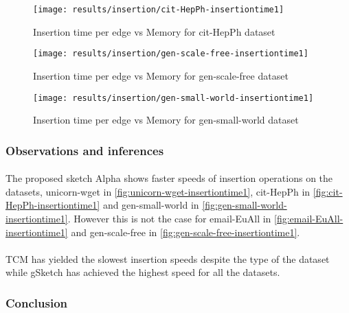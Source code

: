 \begin{figure}[H]
    \centering \texttt{[image: results/insertion/cit-HepPh-insertiontime1]}
    \vspace{-0.5cm}
    \caption{Insertion time per edge vs Memory for cit-HepPh dataset}
    \label{fig:cit-HepPh-insertiontime1}
\end{figure}

\begin{figure}[H]
    \centering \texttt{[image: results/insertion/gen-scale-free-insertiontime1]}
    \vspace{-0.5cm}
    \caption{Insertion time per edge vs Memory for gen-scale-free dataset}
    \label{fig:gen-scale-free-insertiontime1}
\end{figure}

\begin{figure}[H]
    \centering \texttt{[image: results/insertion/gen-small-world-insertiontime1]}
    \vspace{-0.5cm}
    \caption{Insertion time per edge vs Memory for gen-small-world dataset}
    \label{fig:gen-small-world-insertiontime1}
\end{figure}

\subsubsection{Observations and inferences}

\paragraph{}
The proposed sketch Alpha shows faster speeds of insertion operations on the datasets, unicorn-wget in \autoref{fig:unicorn-wget-insertiontime1}, cit-HepPh in \autoref{fig:cit-HepPh-insertiontime1} and gen-small-world in \autoref{fig:gen-small-world-insertiontime1}. However this is not the case for email-EuAll in \autoref{fig:email-EuAll-insertiontime1} and gen-scale-free in \autoref{fig:gen-scale-free-insertiontime1}.

\paragraph{}
TCM has yielded the slowest insertion speeds despite the type of the dataset while gSketch has achieved the highest speed for all the datasets.

\subsubsection{Conclusion}

